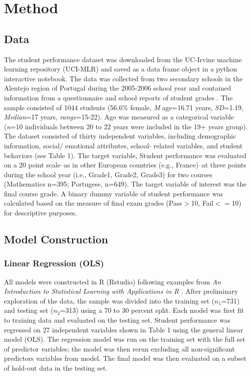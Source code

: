 \documentclass[sigconf]{acmart}
\begin{document}
\section{Method}

\subsection{Data}

The student performance dataset was downloaded from the UC-Irvine machine 
learning repository (UCI-MLR) and saved as a data frame object in a python 
interactive notebook. The data was collected from two secondary schools in 
the Alentejo region of Portugal during the 2005-2006 school year and 
contained information from a questionnaire and school reports of student 
grades \cite{cortez08}. The sample consisted of 1044 students (56.6\% female, 
\textit{M} age=16.71 years, \textit{SD}=1.19, \textit{Median}=17 years, 
\textit{range}=15-22). Age was measured as a categorical variable 
(\textit{n}=10 individuals between 20 to 22 years were included in the 19+ 
years group). The dataset consisted of thirty independent variables, 
including demographic information, social/ emotional attributes, school-
related variables, and student behaviors (see Table 1). The target variable, 
Student performance was evaluated on a 20 point scale--as in other European 
countries (e.g., France)--at three points during the school year (i.e., 
Grade1, Grade2, Grade3) for two courses (Mathematics n=395; Portugese, n=649). 
The target variable of interest was the final course grade. A binary dummy 
variable of student performance was calculated based on the measure of final 
exam grades (Pass$>$10, Fail$<=$10) for descriptive purposes.


\subsection{Model Construction}

\subsubsection{Linear Regression (OLS)} 

All models were constructed in R (Rstudio) following examples from
\emph{An Introduction to Statistical Learning with Applications in R}
\cite{jamesetal13}. After preliminary exploration of the data, the sample 
was divided into the training set ($n_1$=731) and testing set ($n_2$=313) 
using a 70 to 30 percent split. Each model was first fit to training data 
and evaluated on the testing set. Student performance was regressed on 
27 independent variables shown in Table 1 using the general linear model 
(OLS). The regression model was run on the training set with the full 
set of predictor variables; the model was then rerun excluding all 
non-significant predictors variables from model. The final model was then 
evaluated on a subset of hold-out data in the testing set. 
\end{document}
